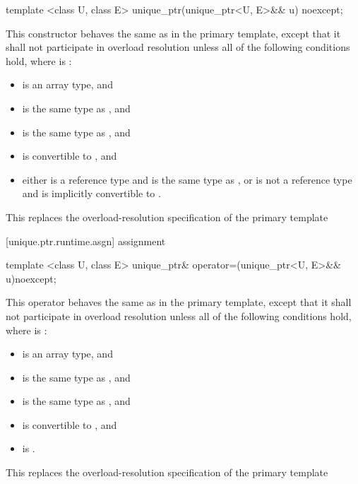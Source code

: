 %
\begin{itemdecl}
template <class U, class E>
  unique_ptr(unique_ptr<U, E>&& u) noexcept;
\end{itemdecl}

\begin{itemdescr}
\pnum
This constructor behaves the same as in the primary template,
except that it shall not participate in overload resolution
unless all of the following conditions hold,
where  is :

\begin{itemize}
\item {} is an array type, and
\item {} is the same type as , and
\item {} is the same type as , and
\item {} is convertible to , and
\item either  is a reference type and  is the same type as ,
      or  is not a reference type and  is implicitly convertible to .
\end{itemize}

\begin{note}
This replaces the overload-resolution specification of the primary template
\end{note}
\end{itemdescr}

[unique.ptr.runtime.asgn]{ assignment}

%
\begin{itemdecl}
template <class U, class E>
  unique_ptr& operator=(unique_ptr<U, E>&& u)noexcept;
\end{itemdecl}

\begin{itemdescr}
\pnum
This operator behaves the same as in the primary template,
except that it shall not participate in overload resolution
unless all of the following conditions hold,
where  is :

\begin{itemize}
\item {} is an array type, and
\item {} is the same type as , and
\item {} is the same type as , and
\item {} is convertible to , and
\item {} is .
\end{itemize}

\begin{note}
This replaces the overload-resolution specification of the primary template
\end{note}
\end{itemdescr}

